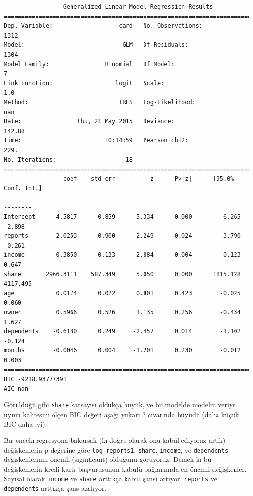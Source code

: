 \documentclass[12pt,fleqn]{article}\usepackage{../../common}
\begin{document}
\begin{verbatim}
                 Generalized Linear Model Regression Results                  
==============================================================================
Dep. Variable:                   card   No. Observations:                 1312
Model:                            GLM   Df Residuals:                     1304
Model Family:                Binomial   Df Model:                            7
Link Function:                  logit   Scale:                             1.0
Method:                          IRLS   Log-Likelihood:                    nan
Date:                Thu, 21 May 2015   Deviance:                       142.88
Time:                        10:14:59   Pearson chi2:                     229.
No. Iterations:                    18                                         
==============================================================================
                 coef    std err          z      P>|z|      [95.0% Conf. Int.]
------------------------------------------------------------------------------
Intercept     -4.5817      0.859     -5.334      0.000        -6.265    -2.898
reports       -2.0253      0.900     -2.249      0.024        -3.790    -0.261
income         0.3850      0.133      2.884      0.004         0.123     0.647
share       2966.3111    587.349      5.050      0.000      1815.128  4117.495
age            0.0174      0.022      0.801      0.423        -0.025     0.060
owner          0.5966      0.526      1.135      0.256        -0.434     1.627
dependents    -0.6130      0.249     -2.457      0.014        -1.102    -0.124
months        -0.0046      0.004     -1.201      0.230        -0.012     0.003
==============================================================================
BIC -9218.93777391
AIC nan
\end{verbatim}

Görüldüğü gibi \verb!share! katsayısı oldukça büyük, ve bu modelde modelin
veriye uyum kalitesini ölçen BIC değeri aşağı yukarı 3 civarında büyüdü (daha
küçük BIC daha iyi).

Bir önceki regresyona bakarsak (ki doğru olarak onu kabul ediyoruz artık)
değişkenlerin p-değerine göre \verb!log_reports1!, \verb!share!, \verb!income!,
ve \verb!dependents! değişkenlerinin önemli (significant) olduğunu
görüyoruz. Demek ki bu değişkenlerin kredi kartı başvurusunun kabulü bağlamında
en önemli değişkenler. Sayısal olarak \verb!income! ve \verb!share! arttıkça
kabul şansı artıyor, \verb!reports! ve \verb!dependents! arttıkça şans azalıyor.
\end{document}
